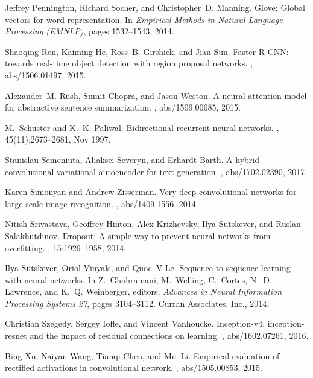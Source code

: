 \documentclass{article}
\begin{document}
\begin{thebibliography}{10}
Jeffrey Pennington, Richard Socher, and Christopher~D. Manning.
\newblock Glove: Global vectors for word representation.
\newblock In {\em Empirical Methods in Natural Language Processing (EMNLP)},
  pages 1532--1543, 2014.

Shaoqing Ren, Kaiming He, Ross~B. Girshick, and Jian Sun.
\newblock Faster {R-CNN:} towards real-time object detection with region
  proposal networks.
, abs/1506.01497, 2015.

Alexander~M. Rush, Sumit Chopra, and Jason Weston.
\newblock A neural attention model for abstractive sentence summarization.
, abs/1509.00685, 2015.

M.~Schuster and K.~K. Paliwal.
\newblock Bidirectional recurrent neural networks.
, 45(11):2673--2681, Nov
  1997.

Stanislau Semeniuta, Aliaksei Severyn, and Erhardt Barth.
\newblock A hybrid convolutional variational autoencoder for text generation.
, abs/1702.02390, 2017.

Karen Simonyan and Andrew Zisserman.
\newblock Very deep convolutional networks for large-scale image recognition.
, abs/1409.1556, 2014.

Nitish Srivastava, Geoffrey Hinton, Alex Krizhevsky, Ilya Sutskever, and Ruslan
  Salakhutdinov.
\newblock Dropout: A simple way to prevent neural networks from overfitting.
, 15:1929--1958, 2014.

Ilya Sutskever, Oriol Vinyals, and Quoc~V Le.
\newblock Sequence to sequence learning with neural networks.
\newblock In Z.~Ghahramani, M.~Welling, C.~Cortes, N.~D. Lawrence, and K.~Q.
  Weinberger, editors, {\em Advances in Neural Information Processing Systems
  27}, pages 3104--3112. Curran Associates, Inc., 2014.

Christian Szegedy, Sergey Ioffe, and Vincent Vanhoucke.
\newblock Inception-v4, inception-resnet and the impact of residual connections
  on learning.
, abs/1602.07261, 2016.

Bing Xu, Naiyan Wang, Tianqi Chen, and Mu~Li.
\newblock Empirical evaluation of rectified activations in convolutional
  network.
, abs/1505.00853, 2015.


\end{thebibliography}
\end{document}

